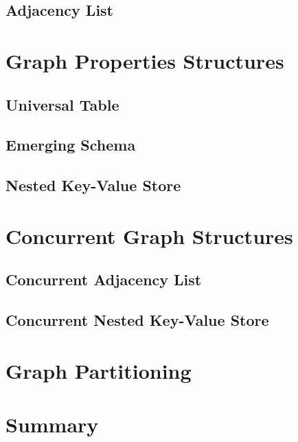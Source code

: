 {\subsection{Adjacency List}
\label{subsec:PhyDesign-AdjacencyList}





\section{Graph Properties Structures}
\label{sec:PhyDesign-GraphProperties}




\subsection{Universal Table}
\label{subsec:PhyDesign-UniversalTable}


\subsection{Emerging Schema}
\label{subsec:PhyDesign-EmergingSchema}


\subsection{Nested Key-Value Store}
\label{subsec:PhyDesign-NestedStore}



\section{Concurrent Graph Structures}
\label{sec:PhyDesign-ConcurrentGraphStructs}


\subsection{Concurrent Adjacency List}
\label{subsec:PhyDesign-ConcurrentAdjacencyList}


\subsection{Concurrent Nested Key-Value Store}
\label{subsec:PhyDesign-ConcurrentNestedStore}



\section{Graph Partitioning}
\label{sec:PhyDesign-GraphPartitioning}



\section{Summary}
\label{sec:PhyDesign-Summary}




}
